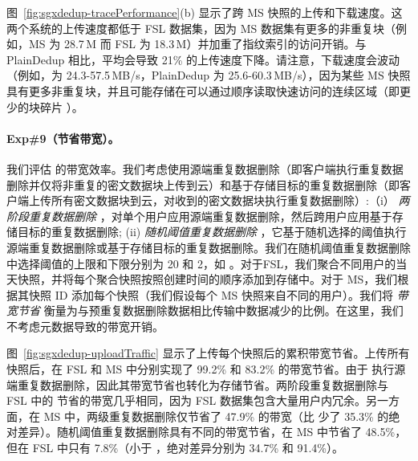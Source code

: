 图~\ref{fig:sgxdedup-tracePerformance}(b) 显示了跨 MS 快照的上传和下载速度。这两个系统的上传速度都低于 FSL 数据集，因为 MS 数据集有更多的非重复块（例如，MS 为 28.7\,M 而 FSL 为 18.3\,M）并加重了指纹索引的访问开销。与 PlainDedup 相比，\sysnameS 平均会导致 21\% 的上传速度下降。请注意，下载速度会波动（例如，\sysnameS 为 24.3-57.5\,MB/s，PlainDedup 为 25.6-60.3\,MB/s），因为某些 MS 快照具有更多非重复块，并且可能存储在可以通过顺序读取快速访问的连续区域（即更少的块碎片 \cite{lillibridge13}）。

\paragraph*{Exp\#9（节省带宽）。} 我们评估 \sysnameS 的带宽效率。我们考虑使用源端重复数据删除（即客户端执行重复数据删除并仅将非重复的密文数据块上传到云）和基于存储目标的重复数据删除（即客户端上传所有密文数据块到云，对收到的密文数据块执行重复数据删除）:（i）\textit{ 两阶段重复数据删除} \cite{li15}，对单个用户应用源端重复数据删除，然后跨用户应用基于存储目标的重复数据删除; (ii) \textit{ 随机阈值重复数据删除} \cite{harnik10}，它基于随机选择的阈值执行源端重复数据删除或基于存储目标的重复数据删除。我们在随机阈值重复数据删除中选择阈值的上限和下限分别为 20 和 2，如 \cite{harnik10}。对于FSL，我们聚合不同用户的当天快照，并将每个聚合快照按照创建时间的顺序添加到存储中。对于 MS，我们根据其快照 ID 添加每个快照（我们假设每个 MS 快照来自不同的用户）。我们将 \textit{ 带宽节省} 衡量为与预重复数据删除数据相比传输中数据减少的比例。在这里，我们不考虑元数据导致的带宽开销。

图~\ref{fig:sgxdedup-uploadTraffic} 显示了上传每个快照后的累积带宽节省。上传所有快照后，\sysnameS 在 FSL 和 MS 中分别实现了 99.2\% 和 83.2\% 的带宽节省。由于 \sysnameS 执行源端重复数据删除，因此其带宽节省也转化为存储节省。两阶段重复数据删除与 FSL 中的 \sysnameS 节省的带宽几乎相同，因为 FSL 数据集包含大量用户内冗余。另一方面，在 MS 中，两级重复数据删除仅节省了 47.9\% 的带宽（比 \sysnameS 少了 35.3\% 的绝对差异）。随机阈值重复数据删除具有不同的带宽节省，在 MS 中节省了 48.5\%，但在 FSL 中只有 7.8\%（小于 \sysnameS，绝对差异分别为 34.7\% 和 91.4\%）。

